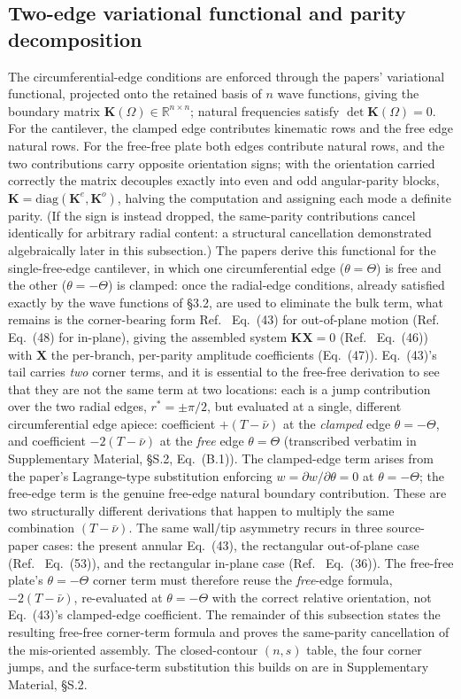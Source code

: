 \documentclass[11pt]{article}
\begin{document}
\subsection{Two-edge variational functional and parity decomposition}
The circumferential-edge conditions are enforced through the papers'
variational functional, projected onto the retained basis of $n$ wave
functions, giving the boundary matrix $\mathbf{K}(\Omega)\in
\mathbb{R}^{n\times n}$; natural frequencies satisfy
$\det\mathbf{K}(\Omega)=0$. For the cantilever, the clamped edge
contributes kinematic rows and the free edge natural rows. For the
free-free plate both edges contribute natural rows, and the two
contributions carry opposite orientation signs; with the orientation
carried correctly the matrix decouples exactly into even and odd
angular-parity blocks,
$\mathbf{K}=\mathrm{diag}(\mathbf{K}^{e},\mathbf{K}^{o})$, halving the
computation and assigning each mode a definite parity. (If the sign is
instead dropped, the same-parity contributions cancel identically for
arbitrary radial content: a structural cancellation demonstrated
algebraically later in this subsection.)
The papers derive this functional for the single-free-edge cantilever, in
which one circumferential edge ($\theta=\Theta$) is free and the other
($\theta=-\Theta$) is clamped: once the radial-edge conditions, already
satisfied exactly by the wave functions of \S3.2, are used to
eliminate the bulk term, what remains is the corner-bearing form
Ref.~\cite{seok1} Eq.~(43) for out-of-plane motion (Ref.~\cite{seok2}
Eq.~(48) for in-plane), giving the assembled system $\mathbf{K}\mathbf{X}=0$
(Ref.~\cite{seok1} Eq.~(46)) with $\mathbf{X}$ the per-branch, per-parity
amplitude coefficients (Eq.~(47)). Eq.~(43)'s tail carries \emph{two}
corner terms, and it is essential to the free-free derivation to see that
they are not the same term at two locations: each is a jump contribution
over the two radial edges, $r^{*}=\pm\pi/2$, but evaluated at a single,
different circumferential edge apiece: coefficient $+(T-\bar\nu)$ at the
\emph{clamped} edge $\theta=-\Theta$, and coefficient $-2(T-\bar\nu)$ at the
\emph{free} edge $\theta=\Theta$ (transcribed verbatim in
Supplementary Material, §S.2, Eq.~(B.1)). The clamped-edge term arises
from the paper's Lagrange-type substitution enforcing $w=\partial
w/\partial\theta=0$ at $\theta=-\Theta$; the free-edge term is the genuine
free-edge natural boundary contribution. These are two structurally
different derivations that happen to multiply the same combination
$(T-\bar\nu)$. The same wall/tip asymmetry recurs in three source-paper
cases: the present annular Eq.~(43), the rectangular out-of-plane case
(Ref.~\cite{seok3} Eq.~(53)), and the rectangular in-plane case
(Ref.~\cite{seok4} Eq.~(36)). The
free-free plate's $\theta=-\Theta$ corner term must therefore reuse the
\emph{free}-edge formula, $-2(T-\bar\nu)$, re-evaluated at $\theta=-\Theta$
with the correct relative orientation, not Eq.~(43)'s clamped-edge
coefficient. The remainder of this subsection states the resulting free-free
corner-term formula and proves the same-parity cancellation of the
mis-oriented assembly. The closed-contour $(n,s)$ table, the four
corner jumps, and the surface-term substitution this builds on are in
Supplementary Material, §S.2.
\end{document}
